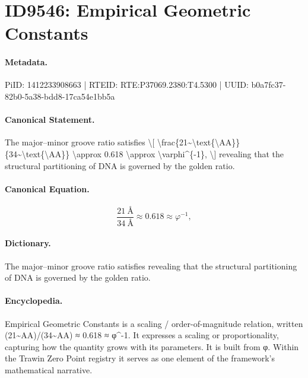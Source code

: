 \section*{ID9546: Empirical Geometric Constants}
\paragraph{Metadata.}
PiID: 1412233908663 | RTEID: RTE:P37069.2380:T4.5300 | UUID: b0a7fc37-82b0-5a38-bdd8-17ca54e1bb5a

\paragraph{Canonical Statement.}
The major--minor groove ratio satisfies \textbackslash{}[ \textbackslash{}frac\{21\textasciitilde{}\textbackslash{}text\{\textbackslash{}AA\}\}\{34\textasciitilde{}\textbackslash{}text\{\textbackslash{}AA\}\} \textbackslash{}approx 0.618 \textbackslash{}approx \textbackslash{}varphi\textasciicircum{}\{-1\}, \textbackslash{}] revealing that the structural partitioning of DNA is governed by the golden ratio.

\paragraph{Canonical Equation.}
\[
\frac{21~\text{\AA}}{34~\text{\AA}} \approx 0.618 \approx \varphi^{-1},
\]

\paragraph{Dictionary.}
The major--minor groove ratio satisfies revealing that the structural partitioning of DNA is governed by the golden ratio.

\paragraph{Encyclopedia.}
Empirical Geometric Constants is a scaling / order-of-magnitude relation, written (21\textasciitilde{}AA)/(34\textasciitilde{}AA) ≈ 0.618 ≈ φ\textasciicircum{}-1. It expresses a scaling or proportionality, capturing how the quantity grows with its parameters. It is built from φ. Within the Trawin Zero Point registry it serves as one element of the framework's mathematical narrative.
